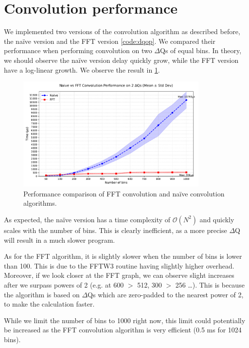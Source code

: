 \section{Convolution performance}
    We implemented two versions of the convolution algorithm as described before, the naïve version and the FFT version \ref{code:dqop}. We compared their performance when performing convolution on two $\Delta$Qs of equal bins. In theory, we should observe the naïve version delay quickly grow, while the FFT version have a log-linear growth. We observe the result in \cref{fig:conv_perf}.
    \begin{figure}[h]
        \begin{center}
            \includegraphics[width=0.85\textwidth]{img/conv_perf.pdf}
        \end{center}
        \caption{Performance comparison of FFT convolution and naïve convolution algorithms.}
        \label{fig:conv_perf}
    \end{figure}

    As expected, the naïve version has a time complexity of $\mathcal{O}(N^2)$ and quickly scales with the number of bins. This is clearly inefficient, as a more precise $\Delta$Q will result in a much slower program.

As for the FFT algorithm, it is slightly slower when the number of bins is lower than 100. This is due to the FFTW3 routine having slightly higher overhead. Moreover, if we look closer at the FFT graph, we can observe slight increases after we surpass powers of 2 (e.g. at 600 $>$ 512, 300 $>$ 256 \dots). This is because the algorithm is based on $\Delta$Qs which are zero-padded to the nearest power of 2, to make the calculation faster.

While we limit the number of bins to 1000 right now, this limit could potentially be increased as the FFT convolution algorithm is very efficient (0.5 ms for 1024 bins).
